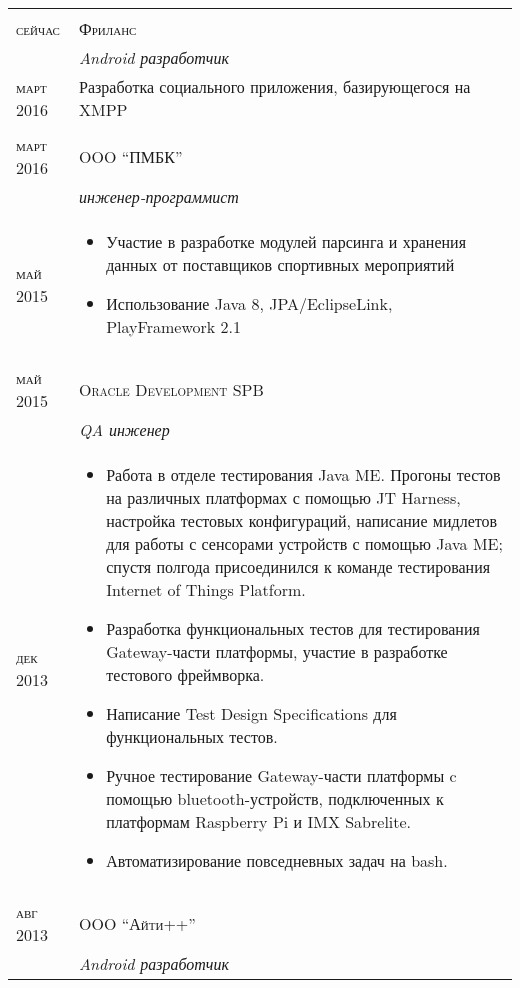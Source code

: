 \documentclass[a4paper,10pt]{article}
\begin{document}
	\begin{tabular}{l|p{12cm}}
		\multicolumn{2}{c}{} \\
			\textsc{сейчас}  & 
				\textsc{Фриланс}\\ &
				\emph{Android разработчик} \\
			\textsc{март 2016}  & Разработка социального приложения, базирующегося на XMPP\\
		\multicolumn{2}{c}{} \\
			\textsc{март 2016} & 
				\textsc{OOO ``ПМБК''}\\ &
				\emph{инженер-программист} \\
			\textsc{май 2015} &
					\begin{itemize}
					\item Участие в разработке модулей парсинга и хранения данных от поставщиков спортивных мероприятий
					\item Использование Java 8, JPA/EclipseLink, PlayFramework 2.1					
					\end{itemize} \\
		\multicolumn{2}{c}{} \\
	  		\textsc{май 2015} & 
				\textsc{Oracle Development SPB} \\ & 
				\emph{QA инженер} \\
	  		\textsc{дек 2013} &
	  			\begin{itemize}
	  			\item Работа в отделе тестирования Java ME. Прогоны тестов на различных платформах с помощью JT Harness, настройка тестовых конфигураций, написание мидлетов для работы с сенсорами устройств с помощью Java ME; спустя полгода присоединился к команде тестирования Internet of Things Platform.
				\item Разработка функциональных тестов для тестирования Gateway-части платформы, участие в разработке тестового фреймворка.
				\item Написание Test Design Specifications для функциональных тестов.
				\item Ручное тестирование Gateway-части платформы c помощью bluetooth-устройств, подключенных к платформам Raspberry Pi и IMX Sabrelite.
				\item Автоматизирование повседневных задач на bash.
				\end{itemize} \\
	    	\multicolumn{2}{c}{} \\
			\textsc{авг 2013}  & 
				\textsc{OOO ``Айти++''}\\ &
				\emph{Android разработчик} \\

\end{tabular}
\end{document}

